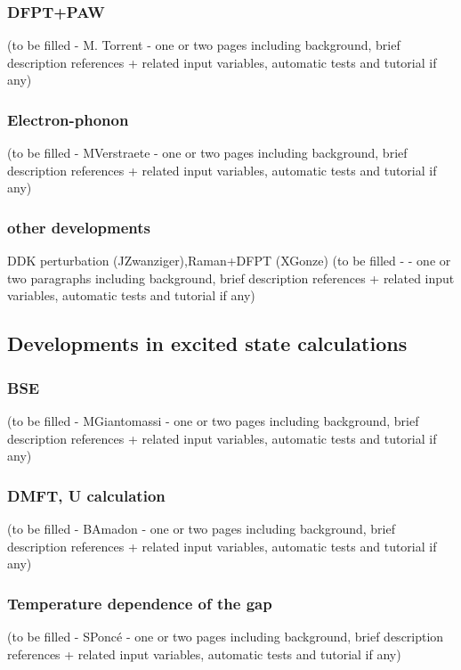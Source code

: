 \documentclass{elsart}
\begin{document}
\subsubsection{DFPT+PAW  }
(to be filled - M. Torrent - one or two pages including background, brief description references + related input variables, automatic tests and tutorial if any)

\subsubsection{Electron-phonon }
(to be filled - MVerstraete - one or two pages including background, brief description references + related input variables, automatic tests and tutorial if any)

\subsubsection{other developments}
DDK perturbation (JZwanziger),Raman+DFPT (XGonze)
(to be filled -  - one or two paragraphs including background, brief description references + related input variables, automatic tests and tutorial if any)

\subsection{Developments in excited state calculations}

\subsubsection{BSE}
(to be filled - MGiantomassi - one or two pages including background, brief description references + related input variables, automatic tests and tutorial if any)

\subsubsection{DMFT, U calculation  }
(to be filled - BAmadon - one or two pages including background, brief description references + related input variables, automatic tests and tutorial if any)

\subsubsection{Temperature dependence of the gap}
(to be filled - SPonc\'e - one or two pages including background, brief description references + related input variables, automatic tests and tutorial if any)
\end{document}
